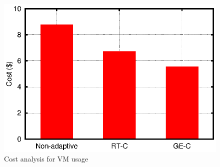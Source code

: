 \begin{figure} [htb]
\centering
\includegraphics[scale=.7]{Graphs/cost.eps}
\caption{Cost analysis for VM usage}
\label{fig:cost}
\end{figure}
